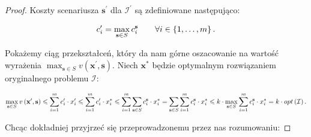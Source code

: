 \begin{proof}
	Koszty scenariusza $\textbf{s}^{\prime}$ dla $\mathcal{I}^{\prime}$ są zdefiniowane następująco:
	
	\begin{equation}
		c^{\prime}_{i} = \max_{\mathclap{\textbf{s} \in S}} c^{\textbf{s}}_{i} \qquad \forall i \in \left\{ 1, \dots, m \right\}\text{.}
	\end{equation}
	
	Pokażemy ciąg przekształceń, który da nam górne oszacowanie na wartość wyrażenia $ \max_{\textbf{s} \in S} v \left( \textbf{x}^{\prime}, \textbf{s} \right)$. Niech $\textbf{x}^{\ast}$ będzie optymalnym rozwiązaniem oryginalnego problemu $\mathcal{I}$:
	
	\begin{equation}
		\max_{\mathclap{\textbf{s} \in S}} v \left( \textbf{x}^{\prime}, \textbf{s} \right) \leqslant \sum_{\mathclap{i = 1}}^{m} c_{i}^{\prime} \cdot x_{i}^{\prime} \leqslant \sum_{\mathclap{i = 1}}^{m} c_{i}^{\prime} \cdot x_{i}^{\ast} \leqslant \sum_{\mathclap{i = 1}}^{m} \sum_{\mathclap{\textbf{s} \in S}} c_{i}^{\textbf{s}} \cdot x_{i}^{\ast} =  \sum_{\mathclap{\textbf{s} \in S}} \sum_{\mathclap{i = 1}}^{m} c_{i}^{\textbf{s}} \cdot x_{i}^{\ast} \leqslant k \cdot \max_{\mathclap{\textbf{s} \in S}} \sum_{\mathclap{i = 1}}^{m} c_{i}^{\textbf{s}} \cdot x_{i}^{\ast} = k \cdot opt \left( \mathcal{I} \right)\text{.}
	\end{equation}
	
	Chcąc dokładniej przyjrzeć się przeprowadzonemu przez nas rozumowaniu:
	

\end{proof}
